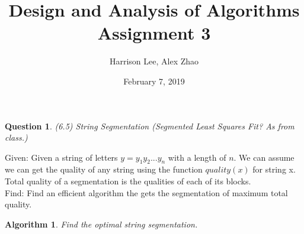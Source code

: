 \documentclass[11pt, oneside]{article}   	%
\title {Design and Analysis of Algorithms Assignment 3}
\author{Harrison Lee, Alex Zhao}
\date{February 7, 2019}
\newtheorem{Question}{Question}
\newtheorem{Algorithm}{Algorithm}
\begin{document}
\maketitle

\begin{Question} (6.5) String Segmentation (Segmented Least Squares Fit? As from class.)
\end{Question}

\noindent Given: Given a string of letters $y = y_1 y_2 ... y_n$ with a length of $n$. We can assume we can get the quality of any string using the function $quality(x)$ for string x. Total quality of a segmentation is the qualities of each of its blocks.\\

\noindent Find: Find an efficient algorithm the gets the segmentation of maximum total quality. \\

\begin{Algorithm}
Find the optimal string segmentation.
\end{Algorithm}
\end{document}
